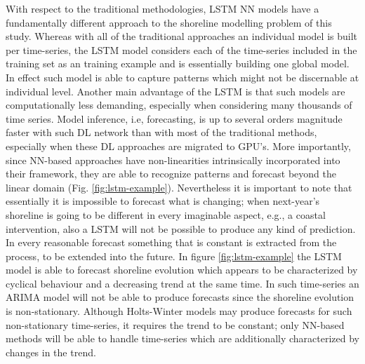 \documentclass[format=sigconf, review=false, screen=true]{acmart}
\begin{document}
With respect to the traditional methodologies, LSTM NN models have a fundamentally different approach to the shoreline modelling problem of this study. Whereas with all of the traditional approaches an individual model is built per time-series, the LSTM model considers each of the time-series included in the training set as an training example and is essentially building one global model. In effect such model is able to capture patterns which might not be discernable at individual level. Another main advantage of the LSTM is that such models are computationally less demanding, especially when considering many thousands of time series. Model inference, i.e, forecasting, is up to several orders magnitude faster with such DL network than with most of the traditional methods, especially when these DL approaches are migrated to GPU's. More importantly, since NN-based approaches have non-linearities intrinsically incorporated into their framework, they are able to recognize patterns and forecast beyond the linear domain (Fig. \ref{fig:lstm-example}). Nevertheless it is important to note that essentially it is impossible to forecast what is changing; when next-year's shoreline is going to be different in every imaginable aspect, e.g., a coastal intervention, also a LSTM will not be possible to produce any kind of prediction. In every reasonable forecast something that is constant is extracted from the process, to be extended into the future. In figure \ref{fig:lstm-example} the LSTM model is able to forecast shoreline evolution which appears to be characterized by cyclical behaviour and a decreasing trend at the same time. In such time-series an ARIMA model will not be able to produce forecasts since the shoreline evolution is non-stationary. Although Holts-Winter models may produce forecasts for such non-stationary time-series, it requires the trend to be constant; only NN-based methods will be able to handle time-series which are additionally characterized by changes in the trend. 
\end{document}
